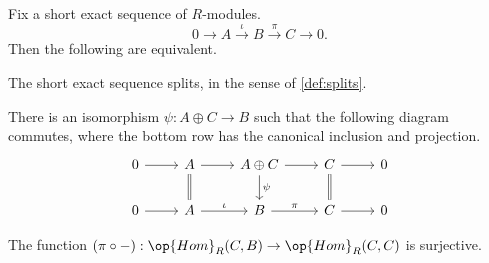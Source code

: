 \begin{lemma} \label{lem:splitgrabbag}
	Fix a short exact sequence of $R$-modules.
	\[0\to A\stackrel\iota\to B\stackrel\pi\to C\to0.\]
	Then the following are equivalent.
	\begin{listalph}
		\item The short exact sequence splits, in the sense of \autoref{def:splits}.
		\item There is an isomorphism $\psi:A\oplus C\to B$ such that the following diagram commutes, where the bottom row has the canonical inclusion and projection.
		\[\begin{tikzcd}
			0 & A & {A\oplus C} & C & 0 \\
			0 & A & B & C & 0
			\arrow[from=1-1, to=1-2]
			\arrow[from=1-2, to=1-3]
			\arrow[from=1-3, to=1-4]
			\arrow[from=1-4, to=1-5]
			\arrow[from=2-1, to=2-2]
			\arrow["\iota", from=2-2, to=2-3]
			\arrow["\pi", from=2-3, to=2-4]
			\arrow[from=2-4, to=2-5]
			\arrow[Rightarrow, no head, from=1-2, to=2-2]
			\arrow["\psi", from=1-3, to=2-3]
			\arrow[Rightarrow, no head, from=1-4, to=2-4]
		\end{tikzcd}\]
		\item The function $(\pi\circ-):\op{Hom}_R(C,B)\to\op{Hom}_R(C,C)$ is surjective.
	\end{listalph}
\end{lemma}

